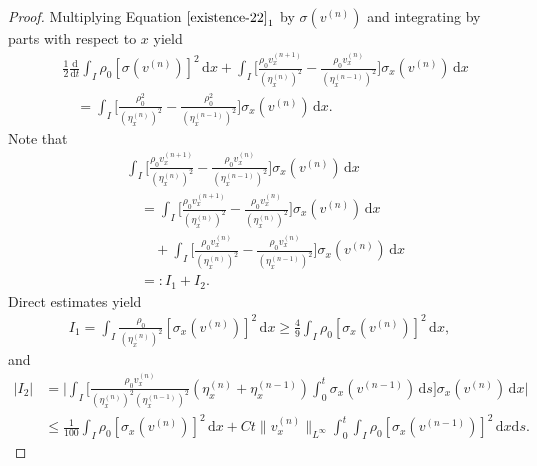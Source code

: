 \documentclass[11pt, reqno]{amsart}
\newcommand{\diff}{\mathrm{d}}
\numberwithin{equation}{section}
\begin{document}
{\begin{proof} Multiplying Equation \(\eqref{existence-22}_1\) by \(\sigma(v^{(n)})\) and integrating by parts with respect to \(x\) yield
	\begin{equation}\label{existence-24}
		\begin{aligned}
			&\frac{1}{2}\frac{\diff}{\diff t}\int_I\rho_0[\sigma(v^{(n)})]^2\,\diff x
			+\int_I\bigg[\frac{\rho_0v_x^{(n+1)}}{(\eta_x^{(n)})^2}
			-\frac{\rho_0v_x^{(n)}}{(\eta_x^{(n-1)})^2}\bigg]\sigma_x(v^{(n)})\,\diff x\\
			&\quad=\int_I\bigg[\frac{\rho_0^2}{(\eta_x^{(n)})^2}-\frac{\rho_0^2}{(\eta_x^{(n-1)})^2}\bigg]\sigma_x(v^{(n)})\,\diff x.		 
		\end{aligned}
	\end{equation}	
Note that
	\begin{equation}\label{existence-25}
		\begin{aligned}
			&\int_I\bigg[\frac{\rho_0v_x^{(n+1)}}{(\eta_x^{(n)})^2}
			-\frac{\rho_0v_x^{(n)}}{(\eta_x^{(n-1)})^2}\bigg]\sigma_x(v^{(n)})\,\diff x\\
			&\quad=\int_I\bigg[\frac{\rho_0v_x^{(n+1)}}{(\eta_x^{(n)})^2}
			-\frac{\rho_0v_x^{(n)}}{(\eta_x^{(n)})^2}\bigg]\sigma_x(v^{(n)})\,\diff x\\
			&\qquad+\int_I\bigg[\frac{\rho_0v_x^{(n)}}{(\eta_x^{(n)})^2}
			-\frac{\rho_0v_x^{(n)}}{(\eta_x^{(n-1)})^2}\bigg]\sigma_x(v^{(n)})\,\diff x\\ 
			&\quad=\colon I_1+I_2.
		\end{aligned}
	\end{equation}	
Direct estimates yield
\begin{equation}\label{existence-26}
	\begin{aligned}
	I_1=\int_I\frac{\rho_0}{(\eta_x^{(n)})^2}
	[\sigma_x(v^{(n)})]^2\,\diff x\geq \frac{4}{9}\int_I\rho_0[\sigma_x(v^{(n)})]^2\,\diff x,
	\end{aligned}
\end{equation}	
and
	\begin{equation}\label{existence-27}
	\begin{aligned}
		|I_2|&=\bigg|\int_I\bigg[\frac{\rho_0v_x^{(n)}}{(\eta_x^{(n)})^2(\eta_x^{(n-1)})^2}(\eta_x^{(n)}+\eta_x^{(n-1)})
		\int_0^t\sigma_x(v^{(n-1)})\,\diff s\bigg]\sigma_x(v^{(n)})\,\diff x\bigg|\\
		&\leq \frac{1}{100}\int_I\rho_0[\sigma_x(v^{(n)})]^2\,\diff x+Ct\|v_x^{(n)}\|_{L^\infty}\int_0^t\int_I\rho_0[\sigma_x(v^{(n-1)})]^2\,\diff x\diff s.
	\end{aligned}

\end{equation}
\end{proof}}
\end{document}
